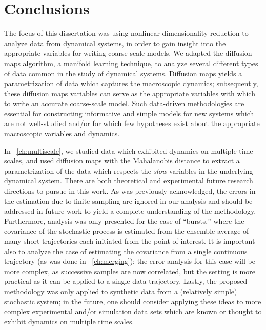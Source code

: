 
\chapter{Conclusions \label{ch:conclusion}}


The focus of this dissertation was using nonlinear dimensionality reduction to analyze data from dynamical systems, in order to gain insight into the appropriate variables for writing coarse-scale models.
%
We adapted the diffusion maps algorithm, a manifold learning technique, to analyze several different types of data common in the study of dynamical systems.
%
Diffusion maps yields a parametrization of data which captures the macroscopic dynamics; subsequently,  these diffusion maps variables can serve as the appropriate variables with which to write an accurate coarse-scale model.
%
Such data-driven methodologies are essential for constructing informative and simple models for new systems which are not well-studied and/or for which few hypotheses exist about the appropriate macroscopic variables and dynamics.

In \chap~\ref{ch:multiscale}, we studied data which exhibited dynamics on multiple time scales, and used diffusion maps with the Mahalanobis distance to extract a parametrization of the data which respects the {\em slow} variables in the underlying dynamical system.
%
There are both theoretical and experimental future research directions to pursue in this work.
%
As was previously acknowledged, the errors in the estimation due to finite sampling are ignored in our analysis and should be addressed in future work to yield a complete understanding of the methodology.
%
Furthermore, analysis was only presented for the case of ``bursts,'' where the covariance of the stochastic process is estimated from the ensemble average of many short trajectories each initiated from the point of interest.
%
It is important also to analyze the case of estimating the covariance from a single continuous trajectory (as was done in \chap~\ref{ch:merging}); the error analysis for this case will be more complex, as successive samples are now correlated, but the setting is more practical as it can be applied to a single data trajectory.
%
Lastly, the proposed methodology was only applied to synthetic data from a (relatively simple) stochastic system; in the future, one should consider applying these ideas to more complex experimental and/or simulation data sets which are known or thought to exhibit dynamics on multiple time scales.

